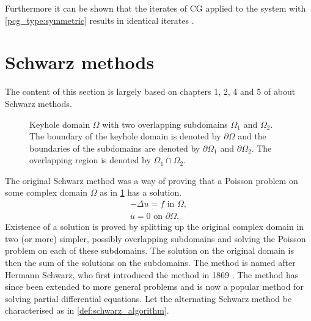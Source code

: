 Furthermore it can be shown that the iterates of CG applied to the system with \ref{pcg_type:symmetric} results in identical iterates \cite[Algorithm 9.2]{iter_method_saad}.

\section{Schwarz methods}\label{sec:schwarz_methods}
The content of this section is largely based on chapters 1, 2, 4 and 5 of \citeauthor{schwarz_methods_Dolean_2015} about Schwarz methods.
\begin{figure}[H]
  \centering
  
  \caption{Keyhole domain $\Omega$ with two overlapping subdomains $\Omega_1$ and $\Omega_2$. The boundary of the keyhole domain is denoted by $\partial\Omega$ and the boundaries of the subdomains are denoted by $\partial\Omega_1$ and $\partial\Omega_2$. The overlapping region is denoted by $\Omega_1 \cap \Omega_2$.}
  \label{fig:keyhole_domain}
\end{figure}
The original Schwarz method was a way of proving that a Poisson problem on some complex domain $\Omega$ as in \cref{fig:keyhole_domain} has a solution.
\begin{equation}
    \begin{array}{c}
        -\Delta u = f \text{ in } \Omega, \\
        u = 0 \text{ on } \partial \Omega.
    \end{array}
    \label{eq:poisson_problem}
\end{equation}
Existence of a solution is proved by splitting up the original complex domain in two (or more) simpler, possibly overlapping subdomains and solving the Poisson problem on each of these subdomains. The solution on the original domain is then the sum of the solutions on the subdomains. The method is named after Hermann Schwarz, who first introduced the method in 1869 \cite{og_schwarz_method_Schwarz}. The method has since been extended to more general problems and is now a popular method for solving partial differential equations. Let the alternating Schwarz method be characterised as in \cref{def:schwarz_algorithm}.
